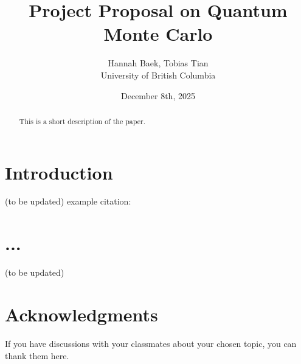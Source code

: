\documentclass[11pt]{article}
\begin{document}
\title{Project Proposal on Quantum Monte Carlo}

\author{Hannah Baek, Tobias Tian \\
University of British Columbia}

\date{\vspace{-2.5ex} December 8th, 2025}
\maketitle

\begin{abstract}
This is a short description of the paper.
\end{abstract}

\section{Introduction}
(to be updated)
example citation: \cite{shor_97}

\section{...}
(to be updated)

\section*{Acknowledgments}

If you have discussions with your classmates about your chosen topic, you can thank them here.



\end{document}
